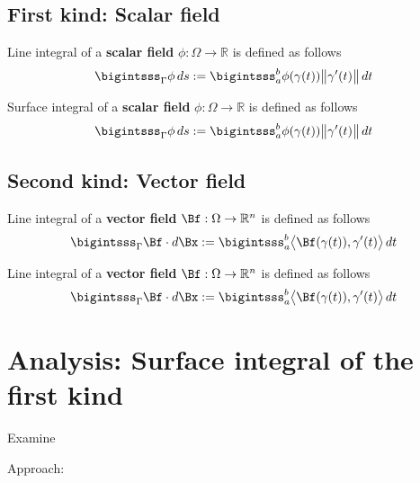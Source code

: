 \documentclass[12pt]{article}
\begin{document}
\subsection{First kind: Scalar field}
\begin{recallboxed}
	\label{recall:scalar}
	Line integral of a 
	\textbf{scalar field} $\phi: \Omega \to \mathbb{R}$ is defined as follows
	\begin{align}
		\bigintsss_{\Gamma} \phi \, ds 
		:= \bigintsss_{a}^{b} \phi(\gamma(t)) \big\| \gamma'(t) \big\| \, dt
	\end{align}
\end{recallboxed}
\begin{recallboxed}
	\label{recall:scalarsurface}
	Surface integral of a 
	\textbf{scalar field} $\phi: \Omega \to \mathbb{R}$ is defined as follows
	\begin{align}
		\bigintsss_{\Gamma} \phi \, ds 
		:= \bigintsss_{a}^{b} \phi(\gamma(t)) \big\| \gamma'(t) \big\| \, dt
	\end{align}
\end{recallboxed}
\subsection{Second kind: Vector field}
\begin{recallboxed}
	\label{recall:vectorsurface}
	Line integral of a \textbf{vector field} $\Bf: \Omega \to \mathbb{R}^{n}$ is defined as follows
	\begin{align}
		\bigintsss_{\Gamma} \Bf \cdot d\Bx 
		:= \bigintsss_{a}^{b} \big\langle \Bf(\gamma(t)), \gamma'(t) \big\rangle \, dt
	\end{align}
\end{recallboxed}
\begin{recallboxed}
	\label{recall:vector}
	Line integral of a \textbf{vector field} $\Bf: \Omega \to \mathbb{R}^{n}$ is defined as follows
	\begin{align}
		\bigintsss_{\Gamma} \Bf \cdot d\Bx 
		:= \bigintsss_{a}^{b} \big\langle \Bf(\gamma(t)), \gamma'(t) \big\rangle \, dt
	\end{align}
\end{recallboxed}
\clearpage
\section{Analysis: Surface integral of the first kind}
\begin{exampleboxed}
	Examine
\end{exampleboxed}
Approach:
\end{document}
